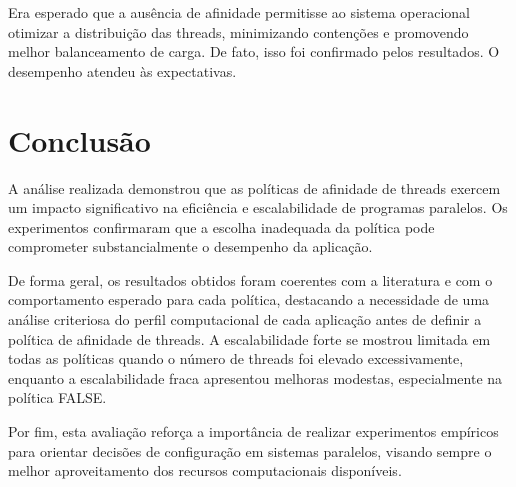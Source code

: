 \documentclass[a4paper, 12pt]{article}
\begin{document}
	Era esperado que a ausência de afinidade permitisse ao sistema operacional otimizar a distribuição das threads, minimizando contenções e promovendo melhor balanceamento de carga. De fato, isso foi confirmado pelos resultados. O desempenho atendeu às expectativas.
	
	\section{Conclusão}

	A análise realizada demonstrou que as políticas de afinidade de threads exercem um impacto significativo na eficiência e escalabilidade de programas paralelos. Os experimentos confirmaram que a escolha inadequada da política pode comprometer substancialmente o desempenho da aplicação.
	
	De forma geral, os resultados obtidos foram coerentes com a literatura e com o comportamento esperado para cada política, destacando a necessidade de uma análise criteriosa do perfil computacional de cada aplicação antes de definir a política de afinidade de threads. A escalabilidade forte se mostrou limitada em todas as políticas quando o número de threads foi elevado excessivamente, enquanto a escalabilidade fraca apresentou melhoras modestas, especialmente na política FALSE.
	
	Por fim, esta avaliação reforça a importância de realizar experimentos empíricos para orientar decisões de configuração em sistemas paralelos, visando sempre o melhor aproveitamento dos recursos computacionais disponíveis.
	
	

	 
\end{document}
